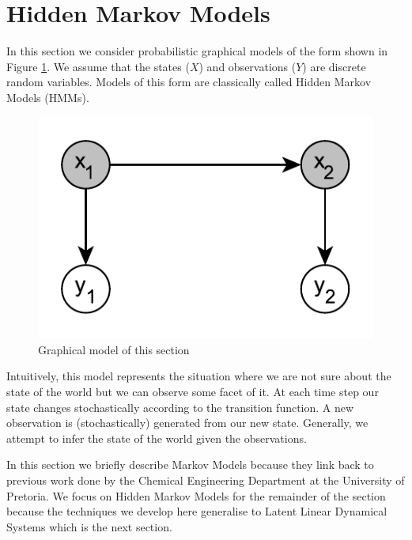 \documentclass[../masters.tex]{subfiles}
\begin{document}
\graphicspath{{./imgs/}{../imgs/}} %

\section{Hidden Markov Models}
In this section we consider probabilistic graphical models of the form shown in Figure \ref{fig_linmod}. We assume that the states ($X$) and observations ($Y$) are discrete random variables. Models of this form are classically called Hidden Markov Models (HMMs).
\begin{figure}[H] 
\centering
\includegraphics[scale=1.0]{hmm_model.pdf}
\caption{Graphical model of this section}
\label{fig_linmod}
\end{figure}
Intuitively, this model represents the situation where we are not sure about the state of the world but we can observe some facet of it. At each time step our state changes stochastically according to the transition function. A new observation is (stochastically) generated from our new state. Generally, we attempt to infer the state of the world given the observations. 

In this section we briefly describe Markov Models because they link back to previous work done by the Chemical Engineering Department at the University of Pretoria. We focus on Hidden Markov Models for the remainder of the section because the techniques we develop here generalise to Latent Linear Dynamical Systems which is the next section. 
\end{document}
